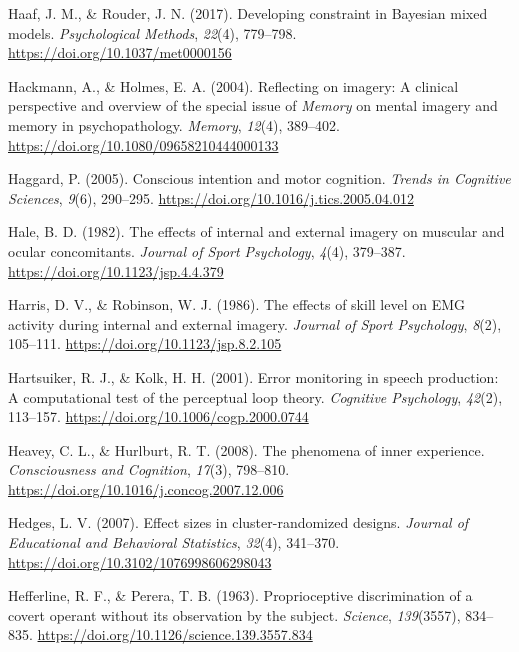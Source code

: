 \documentclass[a4paper,12pt,twoside,onecolumn,openright,final,oldfontcommands]{memoir}
\begin{document}
\leavevmode\hypertarget{ref-haaf_developing_2017}{}%
Haaf, J. M., \& Rouder, J. N. (2017). Developing constraint in Bayesian mixed models. \emph{Psychological Methods}, \emph{22}(4), 779--798. \url{https://doi.org/10.1037/met0000156}

\leavevmode\hypertarget{ref-hackmann_reflecting_2004}{}%
Hackmann, A., \& Holmes, E. A. (2004). Reflecting on imagery: A clinical perspective and overview of the special issue of \emph{Memory} on mental imagery and memory in psychopathology. \emph{Memory}, \emph{12}(4), 389--402. \url{https://doi.org/10.1080/09658210444000133}

\leavevmode\hypertarget{ref-haggard_conscious_2005}{}%
Haggard, P. (2005). Conscious intention and motor cognition. \emph{Trends in Cognitive Sciences}, \emph{9}(6), 290--295. \url{https://doi.org/10.1016/j.tics.2005.04.012}

\leavevmode\hypertarget{ref-hale_effects_1982}{}%
Hale, B. D. (1982). The effects of internal and external imagery on muscular and ocular concomitants. \emph{Journal of Sport Psychology}, \emph{4}(4), 379--387. \url{https://doi.org/10.1123/jsp.4.4.379}

\leavevmode\hypertarget{ref-harris_effects_1986}{}%
Harris, D. V., \& Robinson, W. J. (1986). The effects of skill level on EMG activity during internal and external imagery. \emph{Journal of Sport Psychology}, \emph{8}(2), 105--111. \url{https://doi.org/10.1123/jsp.8.2.105}

\leavevmode\hypertarget{ref-hartsuiker_error_2001}{}%
Hartsuiker, R. J., \& Kolk, H. H. (2001). Error monitoring in speech production: A computational test of the perceptual loop theory. \emph{Cognitive Psychology}, \emph{42}(2), 113--157. \url{https://doi.org/10.1006/cogp.2000.0744}

\leavevmode\hypertarget{ref-heavey_phenomena_2008}{}%
Heavey, C. L., \& Hurlburt, R. T. (2008). The phenomena of inner experience. \emph{Consciousness and Cognition}, \emph{17}(3), 798--810. \url{https://doi.org/10.1016/j.concog.2007.12.006}

\leavevmode\hypertarget{ref-hedges_effect_2007}{}%
Hedges, L. V. (2007). Effect sizes in cluster-randomized designs. \emph{Journal of Educational and Behavioral Statistics}, \emph{32}(4), 341--370. \url{https://doi.org/10.3102/1076998606298043}

\leavevmode\hypertarget{ref-hefferline_proprioceptive_1963}{}%
Hefferline, R. F., \& Perera, T. B. (1963). Proprioceptive discrimination of a covert operant without its observation by the subject. \emph{Science}, \emph{139}(3557), 834--835. \url{https://doi.org/10.1126/science.139.3557.834}
\end{document}

